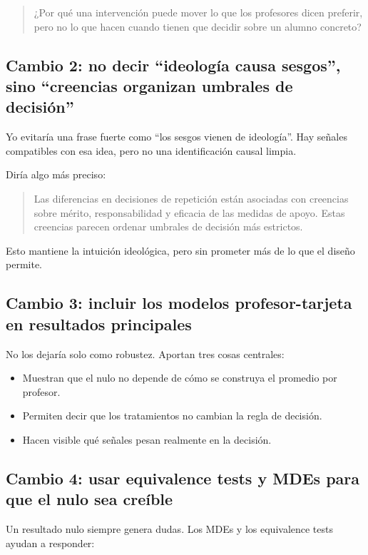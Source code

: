 \documentclass[12pt,a4paper]{article}
\begin{document}
\begin{quote}
¿Por qué una intervención puede mover lo que los profesores dicen preferir, pero no lo que hacen cuando tienen que decidir sobre un alumno concreto?
\end{quote}

\subsection*{Cambio 2: no decir ``ideología causa sesgos'', sino ``creencias organizan umbrales de decisión''}

Yo evitaría una frase fuerte como ``los sesgos vienen de ideología''. Hay señales compatibles con esa idea, pero no una identificación causal limpia.

Diría algo más preciso:

\begin{quote}
Las diferencias en decisiones de repetición están asociadas con creencias sobre mérito, responsabilidad y eficacia de las medidas de apoyo. Estas creencias parecen ordenar umbrales de decisión más estrictos.
\end{quote}

Esto mantiene la intuición ideológica, pero sin prometer más de lo que el diseño permite.

\subsection*{Cambio 3: incluir los modelos profesor-tarjeta en resultados principales}

No los dejaría solo como robustez. Aportan tres cosas centrales:

\begin{itemize}
  \item Muestran que el nulo no depende de cómo se construya el promedio por profesor.
  \item Permiten decir que los tratamientos no cambian la regla de decisión.
  \item Hacen visible qué señales pesan realmente en la decisión.
\end{itemize}

\subsection*{Cambio 4: usar equivalence tests y MDEs para que el nulo sea creíble}

Un resultado nulo siempre genera dudas. Los MDEs y los equivalence tests ayudan a responder:
\end{document}
